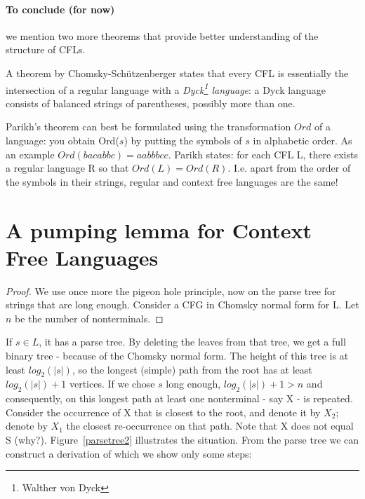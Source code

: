 \paragraph{To conclude (for now)} we mention two more theorems
that provide better understanding of the structure of CFLs.

A theorem by Chomsky-Sch\"{u}tzenberger states that every CFL is
essentially the intersection of a regular language with a {\em
  Dyck\footnote{Walther von Dyck} language}: a Dyck language consists
of balanced strings of parentheses, possibly more than one.

Parikh's theorem can best be formulated using the transformation
$Ord$ of a language: you obtain Ord($s$) by putting the symbols of $s$
in alphabetic order. As an example $Ord(bacabbc) = aabbbcc$. Parikh
states: for each CFL L, there exists a regular language R so that
$Ord(L) = Ord(R)$. I.e. apart from the order of the symbols in their
strings, regular and context free languages are the same!


\clearpage
\section{A pumping lemma for Context Free Languages}\label{pompcfl}

\begin{proof}
We use once more the pigeon hole principle, now on the parse tree for
strings that are long enough. Consider a CFG in Chomsky normal form
for L. Let $n$ be the number of nonterminals.
\end{proof}

If $s \in L$, it has a parse tree. By deleting the
leaves from that tree, we get a full binary tree - because of the Chomsky normal
form. The height of this tree is at least $log_2(|s|)$, so the longest
(simple) path from the root has at least $log_2(|s|) + 1$ vertices. If
we chose $s$ long enough, $log_2(|s|) + 1 > n$ and consequently, on
this longest path at least one nonterminal - say X - is
repeated. Consider the occurrence of X that is closest to the root,
and denote it by $X_2$; denote by $X_1$ the closest re-occurrence on
that path. Note that X does not equal S
(why?). Figure~\ref{parsetree2} illustrates the situation. From the
parse tree we can construct a derivation of which we show only some
steps:


